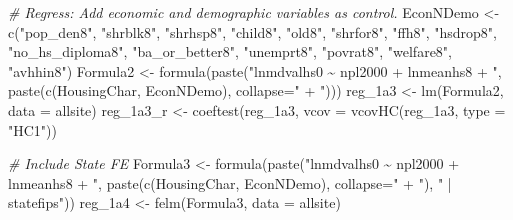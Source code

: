 \documentclass[
]{article}
\newenvironment{Shaded}{\begin{snugshade}}{\end{snugshade}}
\newcommand{\AttributeTok}[1]{\textcolor[rgb]{0.77,0.63,0.00}{#1}}
\newcommand{\CommentTok}[1]{\textcolor[rgb]{0.56,0.35,0.01}{\textit{#1}}}
\newcommand{\FunctionTok}[1]{\textcolor[rgb]{0.00,0.00,0.00}{#1}}
\newcommand{\NormalTok}[1]{#1}
\newcommand{\OtherTok}[1]{\textcolor[rgb]{0.56,0.35,0.01}{#1}}
\newcommand{\StringTok}[1]{\textcolor[rgb]{0.31,0.60,0.02}{#1}}
\begin{document}
\begin{Shaded}
\begin{Highlighting}[]
\CommentTok{\# Regress: Add economic and demographic variables as control.}
\NormalTok{EconNDemo }\OtherTok{\textless{}{-}} \FunctionTok{c}\NormalTok{(}\StringTok{"pop\_den8"}\NormalTok{, }\StringTok{"shrblk8"}\NormalTok{, }\StringTok{"shrhsp8"}\NormalTok{, }\StringTok{"child8"}\NormalTok{, }\StringTok{"old8"}\NormalTok{, }\StringTok{"shrfor8"}\NormalTok{, }\StringTok{"ffh8"}\NormalTok{, }
               \StringTok{"hsdrop8"}\NormalTok{, }\StringTok{"no\_hs\_diploma8"}\NormalTok{, }\StringTok{"ba\_or\_better8"}\NormalTok{, }\StringTok{"unemprt8"}\NormalTok{, }\StringTok{"povrat8"}\NormalTok{, }
               \StringTok{"welfare8"}\NormalTok{, }\StringTok{"avhhin8"}\NormalTok{)}
\NormalTok{Formula2 }\OtherTok{\textless{}{-}} \FunctionTok{formula}\NormalTok{(}\FunctionTok{paste}\NormalTok{(}\StringTok{"lnmdvalhs0 \textasciitilde{} npl2000 + lnmeanhs8 + "}\NormalTok{, }\FunctionTok{paste}\NormalTok{(}\FunctionTok{c}\NormalTok{(HousingChar, EconNDemo), }\AttributeTok{collapse=}\StringTok{" + "}\NormalTok{)))}
\NormalTok{reg\_1a3 }\OtherTok{\textless{}{-}} \FunctionTok{lm}\NormalTok{(Formula2, }\AttributeTok{data =}\NormalTok{ allsite)}
\NormalTok{reg\_1a3\_r }\OtherTok{\textless{}{-}} \FunctionTok{coeftest}\NormalTok{(reg\_1a3, }\AttributeTok{vcov =} \FunctionTok{vcovHC}\NormalTok{(reg\_1a3, }\AttributeTok{type =} \StringTok{"HC1"}\NormalTok{))}

\CommentTok{\# Include State FE}
\NormalTok{Formula3 }\OtherTok{\textless{}{-}} \FunctionTok{formula}\NormalTok{(}\FunctionTok{paste}\NormalTok{(}\StringTok{"lnmdvalhs0 \textasciitilde{} npl2000 + lnmeanhs8 + "}\NormalTok{, }\FunctionTok{paste}\NormalTok{(}\FunctionTok{c}\NormalTok{(HousingChar, EconNDemo), }\AttributeTok{collapse=}\StringTok{" + "}\NormalTok{), }\StringTok{" | statefips"}\NormalTok{))}
\NormalTok{reg\_1a4 }\OtherTok{\textless{}{-}} \FunctionTok{felm}\NormalTok{(Formula3, }\AttributeTok{data =}\NormalTok{ allsite)}


\end{Highlighting}
\end{Shaded}
\end{document}
